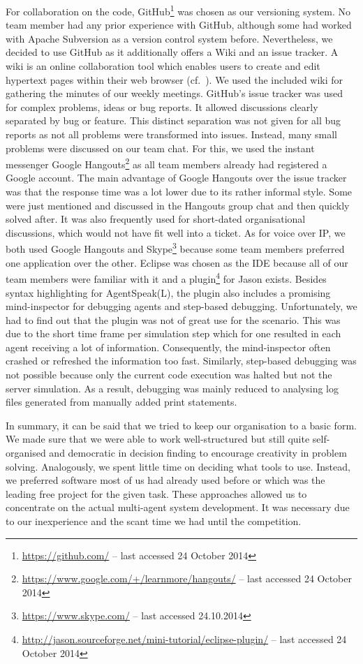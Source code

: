 For collaboration on the code, GitHub\footnote{\url{https://github.com/} -- last accessed 24 October 2014} was chosen as our versioning system.
No team member had any prior experience with GitHub, although some had worked with Apache Subversion as a version control system before.
Nevertheless, we decided to use GitHub as it additionally offers a Wiki and an issue tracker.
A wiki is an online collaboration tool which enables users to create and edit hypertext pages within their web browser (cf.~\cite{leuf_wiki_2001}).
We used the included wiki for gathering the minutes of our weekly meetings.
GitHub's issue tracker was used for complex problems, ideas or bug reports.
It allowed discussions clearly separated by bug or feature.
This distinct separation was not given for all bug reports as not all problems were transformed into issues.
Instead, many small problems were discussed on our team chat.
For this, we used the instant messenger Google Hangouts\footnote{\url{https://www.google.com/+/learnmore/hangouts/} -- last accessed 24 October 2014} as all team members already had registered a Google account.
The main advantage of Google Hangouts over the issue tracker was that the response time was a lot lower due to its rather informal style.
Some were just mentioned and discussed in the Hangouts group chat and then quickly solved after.
It was also frequently used for short-dated organisational discussions, which would not have fit well into a ticket.
As for voice over IP, we both used Google Hangouts and Skype\footnote{\url{https://www.skype.com/} -- last accessed 24.10.2014} because some team members preferred one application over the other.
Eclipse was chosen as the IDE because all of our team members were familiar with it and a plugin\footnote{\url{http://jason.sourceforge.net/mini-tutorial/eclipse-plugin/} -- last accessed 24 October 2014} for Jason exists.
Besides syntax highlighting for AgentSpeak(L), the plugin also includes a promising mind-inspector for debugging agents and step-based debugging.
Unfortunately, we had to find out that the plugin was not of great use for the \mars scenario.
This was due to the short time frame per simulation step which for one resulted in each agent receiving a lot of information.
Consequently, the mind-inspector often crashed or refreshed the information too fast.
Similarly, step-based debugging was not possible because only the current code execution was halted but not the server simulation.
As a result, debugging was mainly reduced to analysing log files generated from manually added print statements.

In summary, it can be said that we tried to keep our organisation to a basic form.
We made sure that we were able to work well-structured but still quite self-organised and democratic in decision finding to encourage creativity in problem solving.
Analogously, we spent little time on deciding what tools to use.
Instead, we preferred software most of us had already used before or which was the leading free project for the given task.
These approaches allowed us to concentrate on the actual multi-agent system development.
It was necessary due to our inexperience and the scant time we had until the competition.
